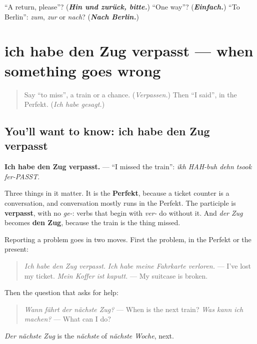 \begin{tcolorbox}[breakable,colback=teal!4,colframe=teal!35!black,title={Before you move on}]
\textquotedblleft{}A return, please\textquotedblright{}? (\emph{\textbf{Hin und zurück, bitte.}}) \textquotedblleft{}One way\textquotedblright{}? (\emph{\textbf{Einfach.}}) \textquotedblleft{}To Berlin\textquotedblright{}: \emph{zum}, \emph{zur} or \emph{nach}? (\emph{\textbf{Nach Berlin.}})
\end{tcolorbox}
\section[ich habe den Zug verpasst]{ich habe den Zug verpasst — when something goes wrong}

\label{lesson:GE-C257-zug-verpasst}



\begin{quote}
Say \textquotedblleft{}to miss\textquotedblright{}, a train or a chance. (\emph{Verpassen.}) Then \textquotedblleft{}I said\textquotedblright{}, in the Perfekt. (\emph{Ich habe gesagt.})
\end{quote}

\subsection*{You'll want to know: ich habe den Zug verpasst}
\textbf{Ich habe den Zug verpasst.} — \textquotedblleft{}I missed the train\textquotedblright{}: \emph{ikh HAH-buh dehn tsook fer-PASST}.

Three things in it matter. It is the \textbf{Perfekt}, because a ticket counter is a conversation, and conversation mostly runs in the Perfekt. The participle is \textbf{verpasst}, with no \emph{ge-}: verbs that begin with \emph{ver-} do without it. And \emph{der Zug} becomes \textbf{den Zug}, because the train is the thing missed.

\begin{grammarlens}[title={Grammar Lens: say what happened, then ask}]
Reporting a problem goes in two moves. First the problem, in the Perfekt or the present:

\begin{quote}
\emph{Ich habe den Zug verpasst.} \emph{Ich habe meine Fahrkarte verloren.} — I've lost my ticket. \emph{Mein Koffer ist kaputt.} — My suitcase is broken.
\end{quote}

Then the question that asks for help:

\begin{quote}
\emph{Wann fährt der nächste Zug?} — When is the next train? \emph{Was kann ich machen?} — What can I do?
\end{quote}

\emph{Der nächste Zug} is the \emph{nächste} of \emph{nächste Woche}, next.
\end{grammarlens}

